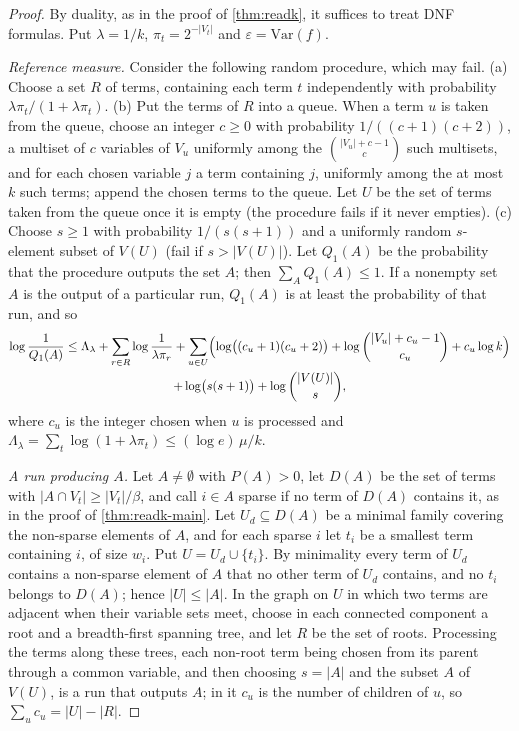 \documentclass[11pt]{amsart}
\theoremstyle{definition}
\theoremstyle{remark}
\newcommand{\Var}{\mathrm{Var}}
\begin{document}
\begin{proof}
By duality, as in the proof of \cref{thm:readk}, it suffices to treat DNF formulas. Put $\lambda=1/k$,
$\pi_t=2^{-|V_t|}$ and $\varepsilon=\Var(f)$.

\emph{Reference measure.} Consider the following random procedure, which may fail.
(a) Choose a set $R$ of terms, containing each term $t$ independently with probability $\lambda\pi_t/(1+\lambda\pi_t)$.
(b) Put the terms of $R$ into a queue. When a term $u$ is taken from the queue, choose an integer $c\ge0$ with
probability $1/((c+1)(c+2))$, a multiset of $c$ variables of $V_u$ uniformly among the $\binom{|V_u|+c-1}{c}$ such
multisets, and for each chosen variable $j$ a term containing $j$, uniformly among the at most $k$ such terms; append
the chosen terms to the queue. Let $U$ be the set of terms taken from the queue once it is empty (the procedure fails
if it never empties).
(c) Choose $s\ge1$ with probability $1/(s(s+1))$ and a uniformly random $s$-element subset of $V(U)$ (fail if
$s>|V(U)|$).
Let $Q_1(A)$ be the probability that the procedure outputs the set $A$; then $\sum_AQ_1(A)\le1$. If a nonempty set $A$
is the output of a particular run, $Q_1(A)$ is at least the probability of that run, and so
\begin{multline}\label{eq:animal}
\log\frac1{Q_1(A)}\le\Lambda_\lambda+\sum_{r\in R}\log\frac1{\lambda\pi_r}
+\sum_{u\in U}\Bigl(\log\bigl((c_u+1)(c_u+2)\bigr)+\log\binom{|V_u|+c_u-1}{c_u}+c_u\log k\Bigr)\\
+\log\bigl(s(s+1)\bigr)+\log\binom{|V(U)|}{s},
\end{multline}
where $c_u$ is the integer chosen when $u$ is processed and $\Lambda_\lambda=\sum_t\log(1+\lambda\pi_t)\le(\log e)\,\mu/k$.

\emph{A run producing $A$.} Let $A\ne\emptyset$ with $P(A)>0$, let $D(A)$ be the set of terms with
$|A\cap V_t|\ge|V_t|/\beta$, and call $i\in A$ sparse if no term of $D(A)$ contains it, as in the proof of
\cref{thm:readk-main}. Let $U_d\subseteq D(A)$ be a minimal family covering the non-sparse elements of $A$, and for
each sparse $i$ let $t_i$ be a smallest term containing $i$, of size $w_i$. Put $U=U_d\cup\{t_i\}$. By minimality every
term of $U_d$ contains a non-sparse element of $A$ that no other term of $U_d$ contains, and no $t_i$ belongs to
$D(A)$; hence $|U|\le|A|$. In the graph on $U$ in which two terms are adjacent when their variable sets meet, choose
in each connected component a root and a breadth-first spanning tree, and let $R$ be the set of roots. Processing the
terms along these trees, each non-root term being chosen from its parent through a common variable, and then choosing
$s=|A|$ and the subset $A$ of $V(U)$, is a run that outputs $A$; in it $c_u$ is the number of children of $u$, so
$\sum_uc_u=|U|-|R|$.


\end{proof}
\end{document}
